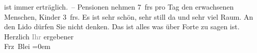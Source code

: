 \begin{ledgroupsized}[t]{13cm}
               ist immer erträglich. –\pend
           \pstart
           Pensionen nehmen 7 frs pro Tag den erwachsenen Menschen, Kinder 3 frs.\pend
           \pstart
           Es ist sehr schön, sehr still da und sehr viel Raum. An den Lido dürfen Sie nicht denken.\pend
           \pstart
           Das ist alles was über Forte zu sagen ist.\pend
           \pstart
           Herzlich \textcolor{gray}{Ihr} ergebener{\\[\baselineskip]}\spacefill\mbox{Frz Blei}\pend
           \leftskip=0em{}\endnumbering{}\end{ledgroupsized}  \newcommand{\dateiname}{L01998}\newcommand{\titel}{Franz Blei an Arthur Schnitzler, [Anfang? Januar 1911]}\newcommand{\editorInnen}{Martin Anton Müller und Gerd-Hermann Susen}
      